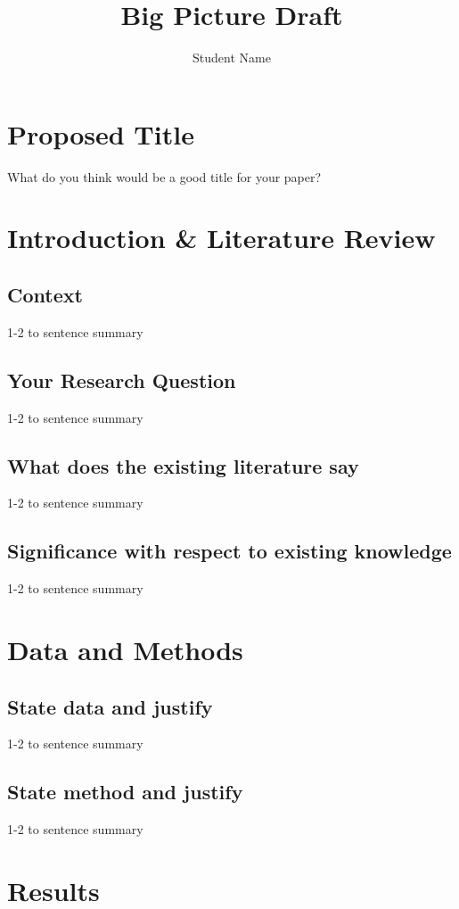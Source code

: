 \documentclass{article}
\title{Big Picture Draft}
\author{Student Name}
\date{}
\begin{document}
\maketitle
 

\section*{Proposed Title}
What do you think would be a good title for your paper?

\section{Introduction \& Literature Review}

\subsection*{Context}
1-2 to sentence summary


\subsection*{Your Research Question}
1-2 to sentence summary

\subsection*{What does the existing literature say}
1-2 to sentence summary

\subsection*{Significance with respect to existing knowledge}
1-2 to sentence summary

\section{Data and Methods}
\subsection*{State data and justify}
1-2 to sentence summary


\subsection*{State method and justify}
1-2 to sentence summary


\section{Results}
\end{document}
